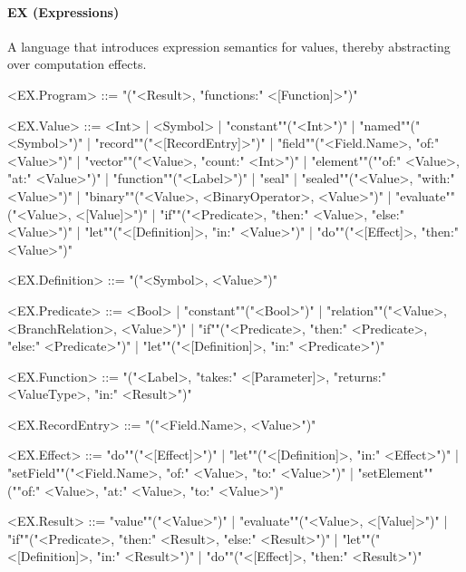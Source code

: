 \documentclass[main.tex]{subfiles}
\begin{document}
\paragraph{ EX (Expressions) } A language that introduces expression semantics for values, thereby abstracting over computation effects.
\begin{grammar}
	\footnotesize
				<EX.Program> ::=
							"("<Result>, "functions:" <[Function]>")"
				\par
				<EX.Value> ::=
						<Int> |
								<Symbol> |
						"constant""("<Int>")"
						| "named""("<Symbol>")"
						| "record""("<[RecordEntry]>")"
						| "field""("<Field.Name>, "of:" <Value>")"
						| "vector""("<Value>, "count:" <Int>")"
						| "element""(""of:" <Value>, "at:" <Value>")"
						| "function""("<Label>")"
						| "seal"
						| "sealed""("<Value>, "with:" <Value>")"
						| "binary""("<Value>, <BinaryOperator>, <Value>")"
						| "evaluate""("<Value>, <[Value]>")"
						| "if""("<Predicate>, "then:" <Value>, "else:" <Value>")"
						| "let""("<[Definition]>, "in:" <Value>")"
						| "do""("<[Effect]>, "then:" <Value>")"
				\par
				<EX.Definition> ::=
							"("<Symbol>, <Value>")"
				\par
				<EX.Predicate> ::=
						<Bool> |
						"constant""("<Bool>")"
						| "relation""("<Value>, <BranchRelation>, <Value>")"
						| "if""("<Predicate>, "then:" <Predicate>, "else:" <Predicate>")"
						| "let""("<[Definition]>, "in:" <Predicate>")"
				\par
				<EX.Function> ::=
							"("<Label>, "takes:" <[Parameter]>, "returns:" <ValueType>, "in:" <Result>")"
				\par
				<EX.RecordEntry> ::=
							"("<Field.Name>, <Value>")"
				\par
				<EX.Effect> ::=
						"do""("<[Effect]>")"
						| "let""("<[Definition]>, "in:" <Effect>")"
						| "setField""("<Field.Name>, "of:" <Value>, "to:" <Value>")"
						| "setElement""(""of:" <Value>, "at:" <Value>, "to:" <Value>")"
				\par
				<EX.Result> ::=
						"value""("<Value>")"
						| "evaluate""("<Value>, <[Value]>")"
						| "if""("<Predicate>, "then:" <Result>, "else:" <Result>")"
						| "let""("<[Definition]>, "in:" <Result>")"
						| "do""("<[Effect]>, "then:" <Result>")"
				\par
\end{grammar}
\par
\end{document}
